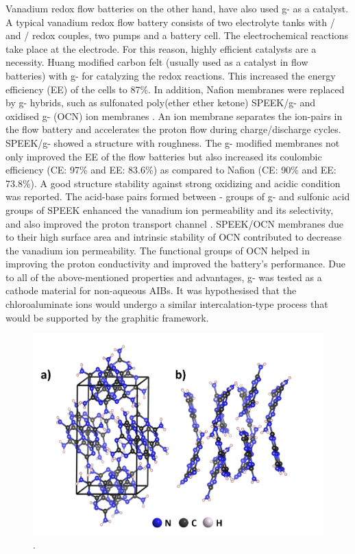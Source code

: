 Vanadium redox flow batteries on the other hand, have also used g- as a catalyst. A typical vanadium redox flow battery consists of two electrolyte tanks with / and / redox couples, two pumps and a battery cell. The electrochemical reactions take place at the electrode. For this reason, highly efficient catalysts are a necessity. Huang  modified carbon felt (usually used as a catalyst in flow batteries) with g- for catalyzing the redox reactions. This increased the energy efficiency (EE) of the cells to 87\%. In addition, Nafion membranes were replaced by g- hybrids, such as sulfonated poly(ether ether ketone) SPEEK/g- and oxidised g- (OCN) ion membranes \cite{niu_novel, wang_novel_17}. An ion membrane separates the ion-pairs in the flow battery and accelerates the proton flow during charge/discharge cycles. SPEEK/g- showed a structure with roughness. The g- modified membranes not only improved the EE of the flow batteries but also increased its coulombic efficiency (CE: 97\% and EE: 83.6\%) as compared to Nafion (CE: 90\% and EE: 73.8\%). A good structure stability against strong oxidizing and acidic condition was reported. The acid-base pairs formed between - groups of g- and sulfonic acid groups of SPEEK enhanced the vanadium ion permeability and its selectivity, and also improved the proton transport channel \cite{wang_novel_17}. SPEEK/OCN membranes due to their high surface area and intrinsic stability of OCN contributed to decrease the vanadium ion permeability. The functional groups of OCN helped in improving the proton conductivity and improved the battery's performance. Due to all of the above-mentioned properties and advantages, g- was tested as a cathode material for non-aqueous AIBs. It was hypothesised that the chloroaluminate ions would undergo a similar intercalation-type process that would be supported by the graphitic framework.

\begin{figure}[th!]
\centering
\includegraphics[width=\textwidth]{Figures/chap6fig/C3N4crys}
\caption{.}
\label{Figures/chap6fig:C3N4crys}
\end{figure}
